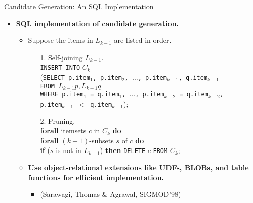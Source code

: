 \begin{frame}{Candidate Generation: An SQL Implementation}
	\begin{itemize}
		\item \textbf{SQL implementation of candidate generation.}
		\begin{itemize}
			\item Suppose the items in $L_{k-1}$ are listed in order.
			\begin{itemize}
				\item[1.] Self-joining $L_{k-1}$.\\
				\texttt{INSERT INTO} $C_k$\\
				\hspace{1cm} (\texttt{SELECT p.item$_1$, p.item$_2$, $\ldots$, 
				p.item$_{k-1}$, q.item$_{k-1}$}\\
				\hspace{1.1cm} \texttt{FROM $L_{k-1} p, L_{k-1} q$}\\
				\hspace{1.1cm} \texttt{WHERE p.item$_1$ = q.item$_1$, $\ldots$, 
				p.item$_{k-2}$ = q.item$_{k-2}$, \\
					\hspace{2.05cm} p.item$_{k-1}$ $<$ q.item$_{k-1}$});
				\item[2.] Pruning.\\
				\hspace{1cm} \textbf{forall} itemsets $c$ in $C_k$ \textbf{do} 
				\\
				\hspace{2cm} \textbf{forall} $(k-1)$-subsets $s$ of $c$ 
				\textbf{do}\\
				\hspace{3cm} \textbf{if} ($s$ is not in $L_{k-1}$) 
				\textbf{then} \texttt{DELETE} $c$ \texttt{FROM} $C_k$;
			\end{itemize}
			\item \textbf{Use object-relational extensions like UDFs, BLOBs, 
			and table functions for efficient implementation.}
			\begin{itemize}
				\item (Sarawagi, Thomas \& Agrawal, SIGMOD'98)
			\end{itemize}
		\end{itemize}
	\end{itemize}
\end{frame}

